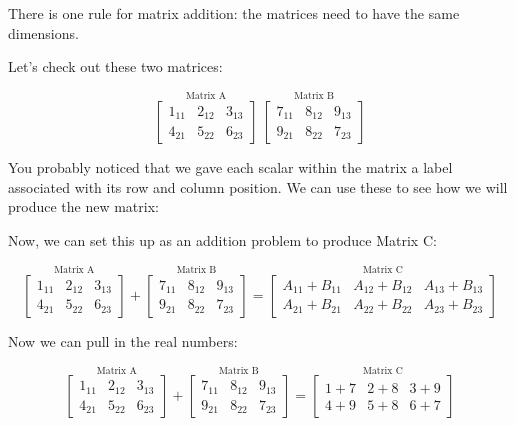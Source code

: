 \documentclass[
]{krantz}
\begin{document}
There is one rule for matrix addition: the matrices need to have the
same dimensions.

Let's check out these two matrices:

\[
\stackrel{\mbox{Matrix A}}{
\begin{bmatrix}
1_{11} & 2_{12} & 3_{13}\\
4_{21} & 5_{22} & 6_{23}
\end{bmatrix}
}  
\ 
\stackrel{\mbox{Matrix B}}{
\begin{bmatrix}
7_{11} & 8_{12} & 9_{13}\\
9_{21} & 8_{22} & 7_{23}
\end{bmatrix} 
}
\]

You probably noticed that we gave each scalar within the matrix a label
associated with its row and column position. We can use these to see how
we will produce the new matrix:

Now, we can set this up as an addition problem to produce Matrix C:

\[
\stackrel{\mbox{Matrix A}}{
\begin{bmatrix}
1_{11} & 2_{12} & 3_{13}\\
4_{21} & 5_{22} & 6_{23}
\end{bmatrix}
}  
+ 
\stackrel{\mbox{Matrix B}}{
\begin{bmatrix}
7_{11} & 8_{12} & 9_{13}\\
9_{21} & 8_{22} & 7_{23}
\end{bmatrix} 
}
=
\stackrel{\mbox{Matrix C}}{
\begin{bmatrix}
A_{11} + B_{11}& A_{12} + B_{12} & A_{13} + B_{13}\\
A_{21} + B_{21}& A_{22} + B_{22} & A_{23} + B_{23}
\end{bmatrix}
}
\]

Now we can pull in the real numbers:

\[
\stackrel{\mbox{Matrix A}}{
\begin{bmatrix}
1_{11} & 2_{12} & 3_{13}\\
4_{21} & 5_{22} & 6_{23}
\end{bmatrix}
}  
+ 
\stackrel{\mbox{Matrix B}}{
\begin{bmatrix}
7_{11} & 8_{12} & 9_{13}\\
9_{21} & 8_{22} & 7_{23}
\end{bmatrix} 
}
=
\stackrel{\mbox{Matrix C}}{
\begin{bmatrix}
1 + 7  & 2 + 8 & 3 + 9\\
4 + 9 & 5 + 8 & 6 + 7
\end{bmatrix}
}
\]
\end{document}
